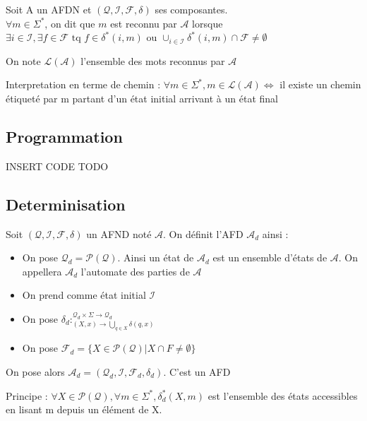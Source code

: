\begin{definition}
    Soit A un AFDN et $(\mathcal{Q},\mathcal{I},\mathcal{F},\delta)$ ses composantes.\\
    $\forall m \in \Sigma^*$, on dit que $m$ est reconnu par $\mathcal{A}$ lorsque
    $\exists i \in \mathcal{I},\exists f \in \mathcal{F} \text{ tq } f\in \delta^*(i,m)$ ou
    $\cup_{i\in \mathcal{I}} \delta^*(i,m)\cap \mathcal{F} \not= \emptyset$

    On note $\mathcal{L}(\mathcal{A})$ l'ensemble des mots reconnus par $\mathcal{A}$
\end{definition}

Interpretation en terme de chemin : $\forall m \in \Sigma^*, m\in \mathcal{L}(\mathcal{A}) \Leftrightarrow$ il existe un chemin
étiqueté par m partant d'un état initial arrivant à un état final

\subsection{Programmation}

INSERT CODE TODO

\subsection{Determinisation}

Soit $(\mathcal{Q},\mathcal{I},\mathcal{F},\delta)$ un AFND noté $\mathcal{A}$.
On définit l'AFD $\mathcal{A}_d$ ainsi :\\

\begin{itemize}
    \item On pose $\mathcal{Q}_d=\mathcal{P}(\mathcal{Q})$. Ainsi un état de $\mathcal{A}_d$ est un ensemble d'états de $\mathcal{A}$. On appellera $\mathcal{A}_d$ l'automate des parties de $\mathcal{A}$
    \item On prend comme état initial $\mathcal{I}$
    \item On pose $\delta_d :^{\mathcal{Q}_d \times\Sigma \longrightarrow \mathcal{Q}_d}_{(X,x)\rightarrow \bigcup_{q\in X}\delta(q,x)}$
    \item On pose $\mathcal{F}_d = \{X\in\mathcal{P}(\mathcal{Q}) | X\cap F \not= \emptyset \}$
\end{itemize}

On pose alors $\mathcal{A}_d = (\mathcal{Q}_d,\mathcal{I},\mathcal{F}_d,\delta_d)$. C'est un AFD

Principe :  $\forall X \in \mathcal{P}(\mathcal{Q}),\forall m \in \Sigma^*,\delta^*_d(X,m)$ est l'ensemble des états accessibles
en lisant m depuis un élément de X.

